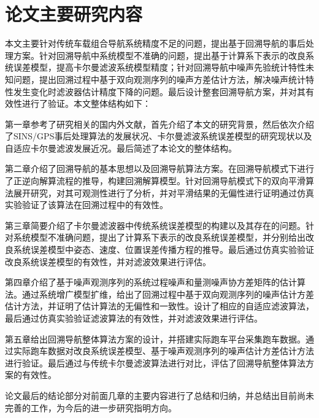 \section{论文主要研究内容}
本文主要针对传统车载组合导航系统精度不足的问题，提出基于回溯导航的事后处理方案。针对回溯导航中系统模型不准确的问题，提出基于计算系下表示的改良系统误差模型，提高卡尔曼滤波系统模型精度；针对回溯导航中噪声先验统计特性未知问题，提出回溯过程中基于双向观测序列的噪声方差估计方法，解决噪声统计特性发生变化时滤波器估计精度下降的问题。最后设计整套回溯导航方案，并对其有效性进行了验证。本文整体结构如下：


第一章参考了研究相关的国内外文献，首先介绍了本文的研究背景，然后依次介绍了SINS/GPS事后处理算法的发展状况、卡尔曼滤波系统误差模型的研究现状以及自适应卡尔曼滤波发展近况。最后简述了本论文的整体结构。

第二章介绍了回溯导航的基本思想以及回溯导航算法方案。在回溯导航模式下进行了正逆向解算流程的推导，构建回溯解算模型。针对回溯导航模式下的双向平滑算法展开研究，对其可观测性进行了分析，并对平滑结果的无偏性进行证明通过仿真实验验证了该算法在回溯过程中的有效性。

第三章简要介绍了卡尔曼滤波器中传统系统误差模型的构建以及其存在的问题。针对系统模型不准确问题，提出了计算系下表示的改良系统误差模型，并分别给出改良系统误差模型中姿态、速度、位置误差传播方程的推导。最后通过仿真实验验证改良系统误差模型的有效性，并对滤波效果进行评估。

第四章介绍了基于噪声观测序列的系统过程噪声和量测噪声协方差矩阵的估计算法。通过系统增广模型扩维，给出了回溯过程中基于双向观测序列的噪声估计方差估计方法，并证明了估计算法的无偏性和一致性。设计了相应的自适应滤波算法，最后通过仿真实验验证滤波算法的有效性，并对滤波效果进行评估。

第五章给出回溯导航整体算法方案的设计，并搭建实际跑车平台采集跑车数据。通过实际跑车数据对改良系统误差模型、基于噪声观测序列的噪声估计方差估计方法进行验证。最后通过与传统卡尔曼滤波算法进行对比，评估了回溯导航整体算法方案的有效性。

论文最后的结论部分对前面几章的主要内容进行了总结和归纳，并总结出目前尚未完善的工作，为今后的进一步研究指明方向。

